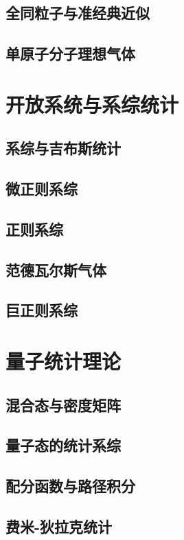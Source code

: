 \documentclass[a4paper]{report}
\begin{document}
\section{全同粒子与准经典近似}
\section{单原子分子理想气体}

\chapter{开放系统与系综统计}
\section{系综与吉布斯统计}
\section{微正则系综}
\section{正则系综}
\section{范德瓦尔斯气体}
\section{巨正则系综}

\chapter{量子统计理论}
\section{混合态与密度矩阵}
\section{量子态的统计系综}
\section{配分函数与路径积分}
\section{费米-狄拉克统计}
\end{document}
